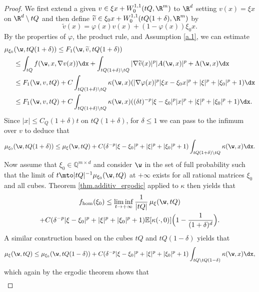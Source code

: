 \begin{proof}
We first extend a given $v\in\xi x+W^{1,1}_0(tQ,\R^m)$ to $\R^d$ setting $v(x)=\xi x$ on $\R^d\setminus tQ$ and then define $\widetilde{v}\in \xi_0 x+W_0^{1,1}(tQ(1+\delta),\R^m)$ by
\begin{equation*}
\widetilde{v}(x)=\varphi(x) v(x)+(1-\varphi(x))\xi_0 x.
\end{equation*}
By the properties of $\varphi$, the product rule, and Assumption \ref{a.1}, we can estimate
\begin{align*}
\mu_{\xi_0}&(\w,tQ(1+\delta))\leq F_1(\w,\widetilde{v},tQ(1+\delta))
\\
&\leq \int_{tQ}f(\w,x,\nabla v(x))\dx+\int_{tQ(1+\delta)\setminus tQ}|\nabla\widetilde{v}(x)|^p|A(\w,x)|^p+\Lambda(\w,x)\dx
\\
&\leq F_1(\w,v,tQ)+C\int_{tQ(1+\delta)\setminus tQ}\kappa(\w,x)(|\nabla\varphi(x)|^p|\xi x-\xi_0 x|^p+|\xi|^p+|\xi_0|^p+1)\dx
\\
&\leq F_1(\w,v,tQ)+C\int_{tQ(1+\delta)\setminus tQ}\kappa(\w,x)((\delta t)^{-p}|\xi-\xi_0|^p|x|^p+|\xi|^p+|\xi_0|^p+1)\dx.
\end{align*}
Since $|x|\leq C_Q(1+\delta)t$ on $tQ(1+\delta)$, for $\delta\leq 1$ we can pass to the infimum over $v$ to deduce that
\begin{equation*}
\mu_{\xi_0}(\w,tQ(1+\delta))\leq \mu_{\xi}(\w,tQ)+C(\delta ^{-p}|\xi-\xi_0|^p+|\xi|^p+|\xi_0|^p+1)\int_{tQ(1+\delta)\setminus tQ}\kappa(\w,x)\dx.
\end{equation*}
Now assume that $\xi_0\in\mathbb{Q}^{m\times d}$ and consider $\w$ in the set of full probability such that the limit of $t\mto |tQ|^{-1}\mu_{\xi_0}(\w,tQ)$ at $+\infty$ exists for all rational matrices $\xi_0$ and all cubes. Theorem \ref{thm.additiv_ergodic} applied to $\kappa$ then yields that
\begin{multline}\label{eq:liminf_est}
f_{\hom}(\xi_0)\leq \liminf_{t\to +\infty}\frac{1}{|tQ|}\,\mu_{\xi}(\w,tQ)
\\
+C(\delta^{-p}|\xi-\xi_0|^p+|\xi|^p+|\xi_0|^p+1)\mathbb{E}[\kappa(\cdot,0)]\Bigl(1-\frac{1}{(1+\delta)^d}\Bigr).
\end{multline}
A similar construction based on the cubes $tQ$ and $tQ(1-\delta)$ yields that
\begin{equation*}
\mu_{\xi}(\w,tQ)\leq \mu_{\xi_0}(\w,tQ(1-\delta))+C(\delta ^{-p}|\xi-\xi_0|^p+|\xi|^p+|\xi_0|^p+1)\int_{tQ\setminus tQ(1-\delta)}\kappa(\w,x)\dx,
\end{equation*}
which again by the ergodic theorem shows that
\begin{multline}\label{eq:limsup_est}

\end{multline}
\end{proof}
